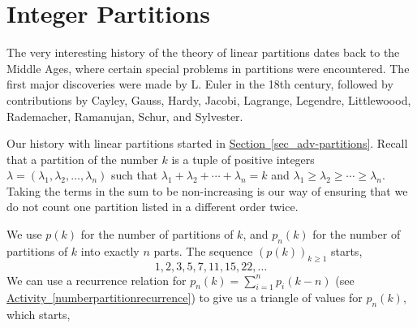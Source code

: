 \documentclass[10pt,]{book}
\theoremstyle{plain}
\theoremstyle{definition}
\theoremstyle{definition}
\theoremstyle{definition}
\numberwithin{equation}{chapter}
\begin{document}
\section[{Integer Partitions}]{Integer Partitions}\label{sec_adv-linearparts}
\hypertarget{p-1493}{}%
The very interesting history of the theory of linear partitions dates back to the Middle Ages, where certain special problems in partitions were encountered.  The first major discoveries were made by L. Euler in the 18th century, followed by contributions by Cayley, Gauss, Hardy, Jacobi, Lagrange, Legendre, Littlewoood, Rademacher, Ramanujan, Schur, and Sylvester.%
\par
\hypertarget{p-1494}{}%
Our history with linear partitions started in \hyperref[sec_adv-partitions]{Section~\ref{sec_adv-partitions}}.  Recall that a partition of the number \(k\) is a tuple of positive integers \(\lambda = (\lambda_1, \lambda_2, \ldots, \lambda_n)\) such that \(\lambda_1 + \lambda_2 + \cdots + \lambda_n = k\) and \(\lambda_1 \ge \lambda_2 \ge \cdots \ge \lambda_n\).  Taking the terms in the sum to be non-increasing is our way of ensuring that we do not count one partition listed in a different order twice.%
\par
\hypertarget{p-1495}{}%
We use \(p(k)\) for the number of partitions of \(k\), and \(p_n(k)\) for the number of partitions of \(k\) into exactly \(n\) parts.  The sequence \((p(k))_{k \ge 1}\) starts,%
\begin{equation*}
1, 2, 3, 5, 7, 11, 15, 22,\ldots
\end{equation*}
We can use a recurrence relation for \(p_n(k) = \sum_{i=1}^n p_i(k-n)\) (see \hyperref[numberpartitionrecurrence]{Activity~\ref{numberpartitionrecurrence}}) to give us a triangle of values for \(p_n(k)\), which starts,%
\end{document}
